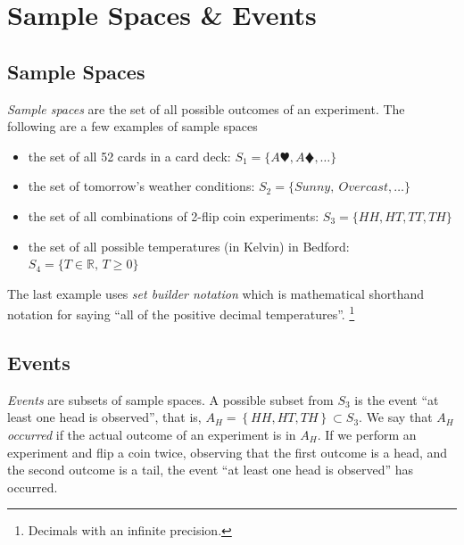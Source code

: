 


\maketitle
\clearpage

\section{Sample Spaces \& Events}

\subsection{Sample Spaces}

\emph{Sample spaces} are the set of all possible outcomes of an experiment. 
The following are a few examples of sample spaces

\begin{itemize}
\item 
the set of all 52 cards in a card deck: 
\(S_{1} = \{A\varheartsuit, A\vardiamondsuit,\ldots\}\)
\item 
the set of tomorrow's weather conditions: 
\(S_{2} = \{ Sunny,\ Overcast,\ldots\}\)
\item 
the set of all combinations of 2-flip coin experiments: 
\(S_{3} = \{HH, HT, TT, TH\}\)
\item 
the set of all possible temperatures (in Kelvin) in Bedford: 
\(S_{4} = \{T \in \mathbb{R}, \, T \geq 0\}\)
\end{itemize}

The last example uses \emph{set builder notation} which is mathematical shorthand notation 
for saying ``all of the positive decimal temperatures''.%
\footnote{Decimals with an infinite precision.}

\subsection{Events}

\emph{Events} are subsets of sample spaces.
A possible subset from \(S_{3}\) is the event ``at least one head is observed'', 
that is, \(A_{H} = \left\{HH, HT, TH\right\} \subset S_{3}\). 
We say that \emph{\(A_{H}\) occurred} if the actual outcome 
of an experiment is in \(A_{H}\). 
If we perform an experiment and flip a coin twice, 
observing that the first outcome is a head, 
and the second outcome is a tail, 
the event ``at least one head is observed'' has occurred.


